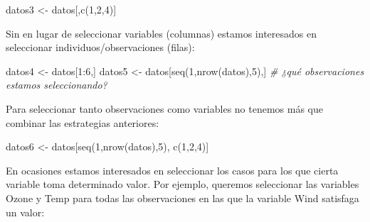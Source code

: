 \documentclass[
]{book}
\newenvironment{Shaded}{\begin{snugshade}}{\end{snugshade}}
\newcommand{\CommentTok}[1]{\textcolor[rgb]{0.56,0.35,0.01}{\textit{#1}}}
\newcommand{\DecValTok}[1]{\textcolor[rgb]{0.00,0.00,0.81}{#1}}
\newcommand{\FunctionTok}[1]{\textcolor[rgb]{0.00,0.00,0.00}{#1}}
\newcommand{\NormalTok}[1]{#1}
\newcommand{\OtherTok}[1]{\textcolor[rgb]{0.56,0.35,0.01}{#1}}
\newcommand{\SpecialCharTok}[1]{\textcolor[rgb]{0.00,0.00,0.00}{#1}}
\begin{document}
\begin{Shaded}
\begin{Highlighting}[]
\NormalTok{datos3 }\OtherTok{\textless{}{-}}\NormalTok{ datos[,}\FunctionTok{c}\NormalTok{(}\DecValTok{1}\NormalTok{,}\DecValTok{2}\NormalTok{,}\DecValTok{4}\NormalTok{)]}
\end{Highlighting}
\end{Shaded}

Sin en lugar de seleccionar variables (columnas) estamos interesados en seleccionar individuos/observaciones (filas):

\begin{Shaded}
\begin{Highlighting}[]
\NormalTok{datos4 }\OtherTok{\textless{}{-}}\NormalTok{ datos[}\DecValTok{1}\SpecialCharTok{:}\DecValTok{6}\NormalTok{,]}
\NormalTok{datos5 }\OtherTok{\textless{}{-}}\NormalTok{ datos[}\FunctionTok{seq}\NormalTok{(}\DecValTok{1}\NormalTok{,}\FunctionTok{nrow}\NormalTok{(datos),}\DecValTok{5}\NormalTok{),] }\CommentTok{\# ¿qué observaciones estamos seleccionando?}
\end{Highlighting}
\end{Shaded}

Para seleccionar tanto observaciones como variables no tenemos más que combinar las estrategias anteriores:

\begin{Shaded}
\begin{Highlighting}[]
\NormalTok{datos6 }\OtherTok{\textless{}{-}}\NormalTok{ datos[}\FunctionTok{seq}\NormalTok{(}\DecValTok{1}\NormalTok{,}\FunctionTok{nrow}\NormalTok{(datos),}\DecValTok{5}\NormalTok{), }\FunctionTok{c}\NormalTok{(}\DecValTok{1}\NormalTok{,}\DecValTok{2}\NormalTok{,}\DecValTok{4}\NormalTok{)] }
\end{Highlighting}
\end{Shaded}

En ocasiones estamos interesados en seleccionar los casos para los que cierta variable toma determinado valor. Por ejemplo, queremos seleccionar las variables Ozone y Temp para todas las observaciones en las que la variable Wind satisfaga un valor:
\end{document}
